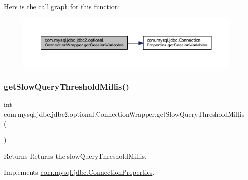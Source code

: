 Here is the call graph for this function\+:
\nopagebreak
\begin{figure}[H]
\begin{center}
\leavevmode
\includegraphics[width=350pt]{classcom_1_1mysql_1_1jdbc_1_1jdbc2_1_1optional_1_1_connection_wrapper_ac7004dec3742a421e0d6e275647eb34f_cgraph}
\end{center}
\end{figure}
\mbox{\label{classcom_1_1mysql_1_1jdbc_1_1jdbc2_1_1optional_1_1_connection_wrapper_ae9a4a918bb9abd4ff539363763f49b25}} 
\subsubsection{\texorpdfstring{get\+Slow\+Query\+Threshold\+Millis()}{getSlowQueryThresholdMillis()}}
{\footnotesize\ttfamily int com.\+mysql.\+jdbc.\+jdbc2.\+optional.\+Connection\+Wrapper.\+get\+Slow\+Query\+Threshold\+Millis (\begin{DoxyParamCaption}{ }\end{DoxyParamCaption})}

\begin{DoxyReturn}{Returns}
Returns the slow\+Query\+Threshold\+Millis. 
\end{DoxyReturn}


Implements \mbox{\hyperlink{interfacecom_1_1mysql_1_1jdbc_1_1_connection_properties_a6c2698e485ad9ad410bceff09e3835f0}{com.\+mysql.\+jdbc.\+Connection\+Properties}}.

